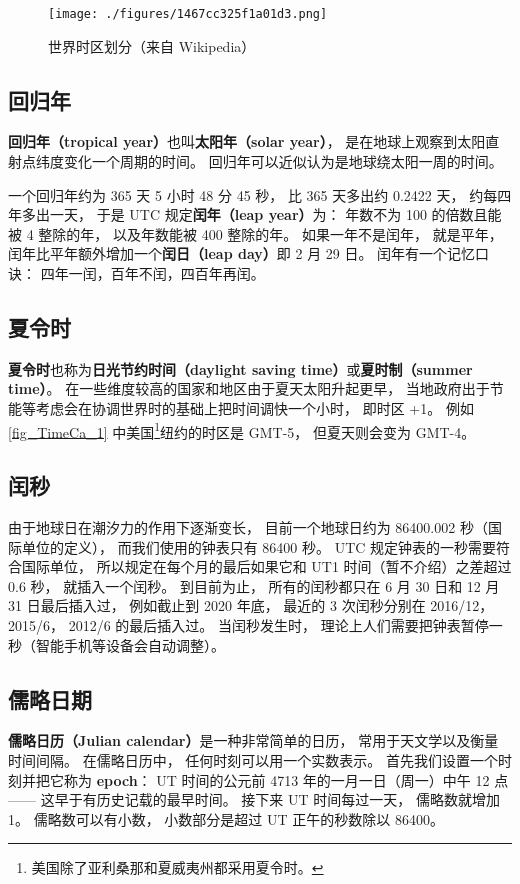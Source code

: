 \begin{figure}[ht]
\centering
\texttt{[image: ./figures/1467cc325f1a01d3.png]}
\caption{世界时区划分（来自 Wikipedia）} \label{fig_TimeCa_1}
\end{figure}

\subsection{回归年}
\textbf{回归年（tropical year）}也叫\textbf{太阳年（solar year）}， 是在地球上观察到太阳直射点纬度变化一个周期的时间。 回归年可以近似认为是地球绕太阳一周的时间。

一个回归年约为 365 天 5 小时 48 分 45 秒， 比 365 天多出约 0.2422 天， 约每四年多出一天， 于是 UTC 规定\textbf{闰年（leap year）}为： 年数不为 100 的倍数且能被 4 整除的年， 以及年数能被 400 整除的年。 如果一年不是闰年， 就是平年， 闰年比平年额外增加一个\textbf{闰日（leap day）}即 2 月 29 日。 闰年有一个记忆口诀： 四年一闰，百年不闰，四百年再闰。

\subsection{夏令时}
\textbf{夏令时}也称为\textbf{日光节约时间（daylight saving time）}或\textbf{夏时制（summer time）}。 在一些维度较高的国家和地区由于夏天太阳升起更早， 当地政府出于节能等考虑会在协调世界时的基础上把时间调快一个小时， 即时区 +1。 例如\autoref{fig_TimeCa_1} 中美国\footnote{美国除了亚利桑那和夏威夷州都采用夏令时。}纽约的时区是 GMT-5， 但夏天则会变为 GMT-4。

\subsection{闰秒}
由于地球日在潮汐力的作用下逐渐变长， 目前一个地球日约为 86400.002 秒（国际单位的定义）， 而我们使用的钟表只有 86400 秒。 UTC 规定钟表的一秒需要符合国际单位， 所以规定在每个月的最后如果它和 UT1 时间（暂不介绍）之差超过 0.6 秒， 就插入一个闰秒。 到目前为止， 所有的闰秒都只在 6 月 30 日和 12 月 31 日最后插入过， 例如截止到 2020 年底， 最近的 3 次闰秒分别在 2016/12， 2015/6， 2012/6 的最后插入过。 当闰秒发生时， 理论上人们需要把钟表暂停一秒（智能手机等设备会自动调整）。

\subsection{儒略日期}

\textbf{儒略日历（Julian calendar）}是一种非常简单的日历， 常用于天文学以及衡量时间间隔。 在儒略日历中， 任何时刻可以用一个实数表示。 首先我们设置一个时刻并把它称为 \textbf{epoch}： UT 时间的公元前 4713 年的一月一日（周一）中午 12 点—— 这早于有历史记载的最早时间。 接下来 UT 时间每过一天， 儒略数就增加 1。 儒略数可以有小数， 小数部分是超过 UT 正午的秒数除以 86400。

